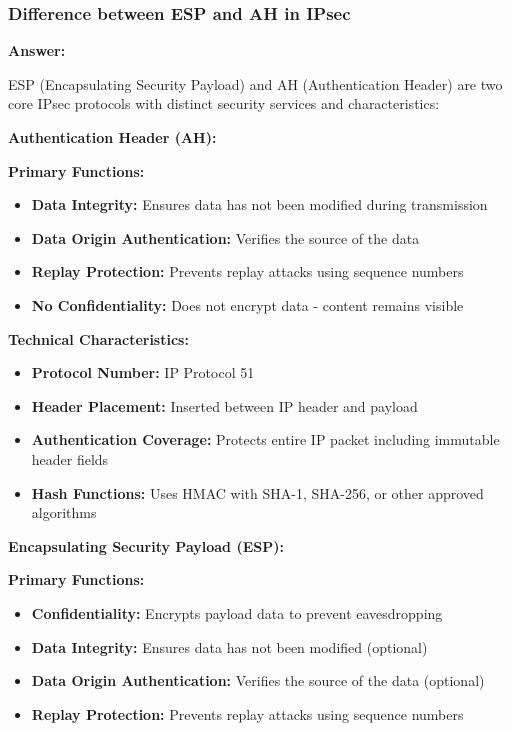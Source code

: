 \documentclass[12pt,a4paper]{article}
\begin{document}
\subsubsection{Difference between ESP and AH in IPsec}

\textbf{Answer:}

ESP (Encapsulating Security Payload) and AH (Authentication Header) are two core IPsec protocols with distinct security services and characteristics:

\textbf{Authentication Header (AH):}

\textbf{Primary Functions:}
\begin{itemize}
    \item \textbf{Data Integrity:} Ensures data has not been modified during transmission
    \item \textbf{Data Origin Authentication:} Verifies the source of the data
    \item \textbf{Replay Protection:} Prevents replay attacks using sequence numbers
    \item \textbf{No Confidentiality:} Does not encrypt data - content remains visible
\end{itemize}

\textbf{Technical Characteristics:}
\begin{itemize}
    \item \textbf{Protocol Number:} IP Protocol 51
    \item \textbf{Header Placement:} Inserted between IP header and payload
    \item \textbf{Authentication Coverage:} Protects entire IP packet including immutable header fields
    \item \textbf{Hash Functions:} Uses HMAC with SHA-1, SHA-256, or other approved algorithms
\end{itemize}

\textbf{Encapsulating Security Payload (ESP):}

\textbf{Primary Functions:}
\begin{itemize}
    \item \textbf{Confidentiality:} Encrypts payload data to prevent eavesdropping
    \item \textbf{Data Integrity:} Ensures data has not been modified (optional)
    \item \textbf{Data Origin Authentication:} Verifies the source of the data (optional)
    \item \textbf{Replay Protection:} Prevents replay attacks using sequence numbers
\end{itemize}
\end{document}
